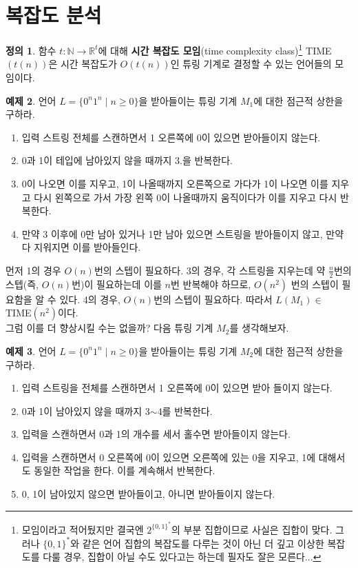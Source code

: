 \documentclass[b5paper, 10pt]{book}
\theoremstyle{definition}
\newtheorem{defn}{정의}[chapter]
\newtheorem{ex}[defn]{예제}
\begin{document}
\section{복잡도 분석}
\begin{defn}
    함수 $t: \mathbb{N} \rightarrow \mathbb{R}^{t}$에 대해 \textbf{시간 복잡도 모임}(time
    complexity class)\footnote{모임이라고 적어뒀지만 결국엔 $2^{\{0,1\}^*}$의 부분 집합이므로 
    사실은 집합이 맞다. 그러나 $\{0,1\}^*$와 같은 언어 집합의 복잡도를 다루는 것이 아닌 더 깊고 이상한 
    복잡도를 다룰 경우, 집합이 아닐 수도 있다고는 하는데 필자도 잘은 모른다...} 
    TIME$(t(n))$은 시간 복잡도가 $O(t(n))$인 튜링 기계로 결정할 수 있는 언어들의 
    모임이다. 
\end{defn}
\begin{ex}
    언어 $L = \{0^n1^n \;\vert\; n \ge 0\}$을 받아들이는 튜링 기계 $M_1$에 대한 점근적 상한을 구하라.
    \begin{enumerate}
        \item 입력 스트링 전체를 스캔하면서 1 오른쪽에 0이 있으면 받아들이지 않는다. 
        \item 0과 1이 테입에 남아있지 않을 때까지 3.을 반복한다. 
        \item 0이 나오면 이를 지우고, 1이 나올때까지 오른쪽으로 가다가 1이 
        나오면 이를 지우고 다시 왼쪽으로 가서
        가장 왼쪽 0이 나올때까지 움직이다가 이를 지우고 다시 반복한다. 
        \item 만약 3 이후에 0만 남아 있거나 1만 남아 있으면 스트링을 받아들이지 
        않고, 만약 다 지워지면 이를 받아들인다. 
    \end{enumerate} 
\end{ex}
먼저 1의 경우 $O(n)$번의 스텝이 필요하다. 3의 경우, 각 스트링을 지우는데 약 $\frac{n}{2}$번의 
스텝(즉, $O(n)$번)이 필요하는데 이를 $n$번 반복해야 하므로, $O(n^2)$ 번의 스텝이 필요함을 알 수 있다. 
4의 경우, $O(n)$번의 스텝이 필요하다. 따라서 $L(M_1) \in$ TIME$(n^2)$이다. \\ 
그럼 이를 더 향상시킬 수는 없을까? 다음 튜링 기계 $M_2$를 생각해보자. 
\begin{ex}
    언어 $L = \{0^n1^n \;\vert\; n \ge 0\}$을 받아들이는 튜링 기계 $M_2$에 대한 점근적 상한을 구하라. 
    \begin{enumerate}
        \item 입력 스트링을 전체를 스캔하면서 1 오른쪽에 0이 있으면 받아 들이지 않는다. 
        \item 0과 1이 남아있지 않을 때까지 3$\sim$4를 반복한다.
        \item 입력을 스캔하면서 0과 1의 개수를 세서 홀수면 받아들이지 않는다.
        \item 입력을 스캔하면서 0 오른쪽에 0이 있으면 오른쪽에 있는 0을 지우고, 1에 대해서도 동일한
        작업을 한다. 이를 계속해서 반복한다.
        \item 0, 1이 남아있지 않으면 받아들이고, 아니면 받아들이지 않는다.
    \end{enumerate}
\end{ex}
\end{document}
